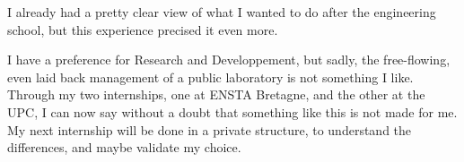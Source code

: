 I already had a pretty clear view of what I wanted to do after the engineering school, but this experience precised it even more.

I have a preference for Research and Developpement, but sadly, the free-flowing, even laid back management of a public laboratory is not something I like.
Through my two internships, one at ENSTA Bretagne, and the other at the UPC, I can now say without a doubt that something like this is not made for me.\\

My next internship will be done in a private structure, to understand the differences, and maybe validate my choice.
